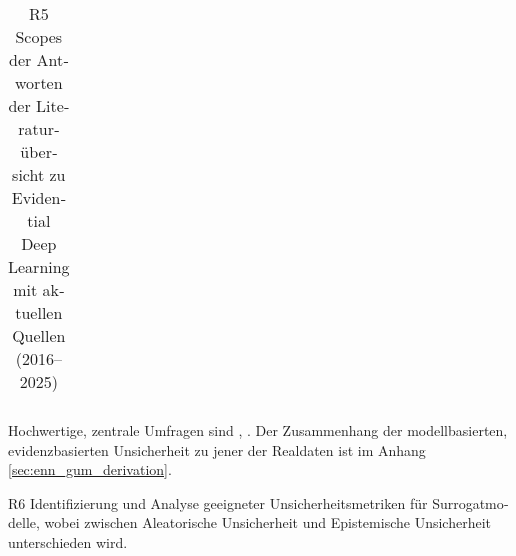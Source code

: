 \begin{otherlanguage}{ngerman}
\begin{table}[htbp]
\begin{tabularx}{\textwidth}{|l|X|}
\end{tabularx}
\caption{R5 Scopes der Antworten der Literaturübersicht zu Evidential Deep Learning mit aktuellen Quellen (2016–2025)}
\label{tab:edl_scopes_sources_updated}
\end{table}

Hochwertige, zentrale Umfragen sind \parencite{Ulmer2023}, \parencite{Gawlikowski2023}. 
Der Zusammenhang der modellbasierten, evidenzbasierten Unsicherheit zu jener der Realdaten ist im Anhang \ref{sec:enn_gum_derivation}.

\pagebreak


R6 Identifizierung und Analyse geeigneter Unsicherheitsmetriken für Surrogatmodelle, wobei zwischen \gls{Aleatorische Unsicherheit} und \gls{Epistemische Unsicherheit} unterschieden wird.


\end{otherlanguage}
